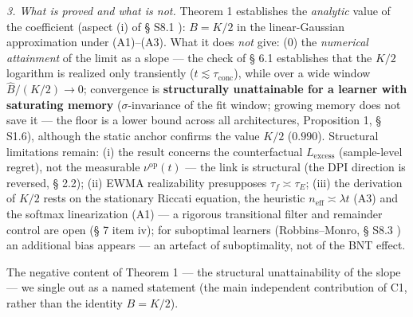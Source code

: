 \documentclass[12pt]{iopart}
\begin{document}
\emph{3. What is proved and what is not.} Theorem 1 establishes the \emph{analytic} value of the coefficient (aspect (i) of § S8.1 \cite{Andriishin2026b}): \(B = K/2\) in the linear-Gaussian approximation under (A1)--(A3). What it does \emph{not} give: (0) the \emph{numerical attainment} of the limit as a slope --- the check of § 6.1 establishes that the \(K/2\) logarithm is realized only transiently (\(t \lesssim \tau_{\text{conc}}\)), while over a wide window \(\hat B/(K/2) \to 0\); convergence is \textbf{structurally unattainable for a learner with saturating memory} (\(\sigma\)-invariance of the fit window; growing memory does not save it --- the floor is a lower bound across all architectures, Proposition 1, § S1.6), although the static anchor confirms the value \(K/2\) (\(0.990\)). Structural limitations remain: (i) the result concerns the counterfactual \(L_{\text{excess}}\) (sample-level regret), not the measurable \(\nu^{\text{op}}(t)\) --- the link is structural (the DPI direction is reversed, § 2.2); (ii) EWMA realizability presupposes \(\tau_f \asymp \tau_E\); (iii) the derivation of \(K/2\) rests on the stationary Riccati equation, the heuristic \(n_{\text{eff}} \asymp \lambda t\) (A3) and the softmax linearization (A1) --- a rigorous transitional filter and remainder control are open (§ 7 item iv); for suboptimal learners (Robbins--Monro, § S8.3 \cite{Andriishin2026b}) an additional bias appears --- an artefact of suboptimality, not of the BNT effect.



The negative content of Theorem 1 --- the structural unattainability of the slope --- we single out as a named statement (the main independent contribution of C1, rather than the identity \(B=K/2\)).
\end{document}
